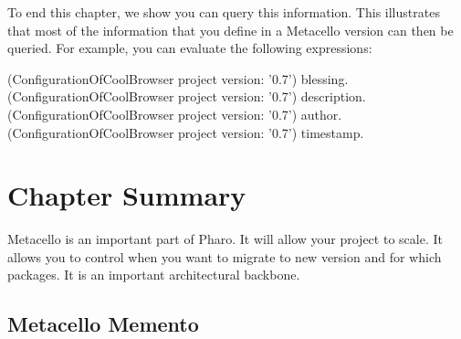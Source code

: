 \documentclass[a4paper,10pt,twoside]{book}
\begin{document}
To end this chapter, we show you can query this information. This illustrates that most of the information that you define in a Metacello version can then be queried. For example, you can evaluate the following expressions:

\begin{code}{}
(ConfigurationOfCoolBrowser project version: '0.7') blessing.
(ConfigurationOfCoolBrowser project version: '0.7') description.
(ConfigurationOfCoolBrowser project version: '0.7') author.
(ConfigurationOfCoolBrowser project version: '0.7') timestamp.
\end{code}


\section{Chapter Summary}
Metacello is an important part of Pharo. It will allow your project to scale. It allows you to control when you want to migrate to new version and for which packages. It is an important architectural backbone.

\subsection{Metacello Memento}
\end{document}
